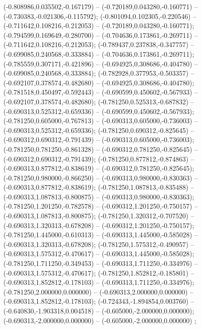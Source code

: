  (-0.808986,0.035502,-0.167179) -- (-0.720189,0.043280,-0.160771) -- (-0.730383,-0.021306,-0.115792);
 (-0.801094,0.102305,-0.220546) -- (-0.711642,0.108216,-0.212053) -- (-0.720189,0.043280,-0.160771);
 (-0.794599,0.169649,-0.280700) -- (-0.704636,0.173861,-0.269711) -- (-0.711642,0.108216,-0.212053);
 (-0.789437,0.237838,-0.347757) -- (-0.699085,0.240568,-0.333884) -- (-0.704636,0.173861,-0.269711);
 (-0.785559,0.307171,-0.421896) -- (-0.694925,0.308686,-0.404780) -- (-0.699085,0.240568,-0.333884);
 (-0.782928,0.377953,-0.503357) -- (-0.692107,0.378574,-0.482680) -- (-0.694925,0.308686,-0.404780);
 (-0.781518,0.450497,-0.592443) -- (-0.690599,0.450602,-0.567933) -- (-0.692107,0.378574,-0.482680);
 (-0.781250,0.525313,-0.687832) -- (-0.690313,0.525312,-0.659336) -- (-0.690599,0.450602,-0.567933);
 (-0.781250,0.605000,-0.767813) -- (-0.690313,0.605000,-0.736003) -- (-0.690313,0.525312,-0.659336);
 (-0.781250,0.690312,-0.825645) -- (-0.690312,0.690312,-0.791439) -- (-0.690313,0.605000,-0.736003);
 (-0.781250,0.781250,-0.861328) -- (-0.690312,0.781250,-0.825645) -- (-0.690312,0.690312,-0.791439);
 (-0.781250,0.877812,-0.874863) -- (-0.690313,0.877812,-0.838619) -- (-0.690312,0.781250,-0.825645);
 (-0.781250,0.980000,-0.866250) -- (-0.690313,0.980000,-0.830363) -- (-0.690313,0.877812,-0.838619);
 (-0.781250,1.087813,-0.835488) -- (-0.690313,1.087813,-0.800875) -- (-0.690313,0.980000,-0.830363);
 (-0.781250,1.201250,-0.782578) -- (-0.690312,1.201250,-0.750157) -- (-0.690313,1.087813,-0.800875);
 (-0.781250,1.320312,-0.707520) -- (-0.690313,1.320313,-0.678208) -- (-0.690312,1.201250,-0.750157);
 (-0.781250,1.445000,-0.610313) -- (-0.690313,1.445000,-0.585028) -- (-0.690313,1.320313,-0.678208);
 (-0.781250,1.575312,-0.490957) -- (-0.690313,1.575312,-0.470617) -- (-0.690313,1.445000,-0.585028);
 (-0.781250,1.711250,-0.349453) -- (-0.690313,1.711250,-0.334976) -- (-0.690313,1.575312,-0.470617);
 (-0.781250,1.852812,-0.185801) -- (-0.690313,1.852812,-0.178103) -- (-0.690313,1.711250,-0.334976);
 (-0.781250,2.000000,0.000000) -- (-0.690313,2.000000,0.000000) -- (-0.690313,1.852812,-0.178103);
 (-0.724343,-1.894854,0.003760) -- (-0.640830,-1.903318,0.004518) -- (-0.605000,-2.000000,0.000000);
 (-0.690313,-2.000000,0.000000) -- (-0.605000,-2.000000,0.000000) ;
